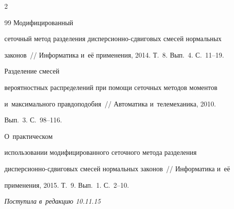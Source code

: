 \begin{multicols}{2}
{{\begin{thebibliography}{99}
  Модифицированный


сеточный метод разделения дис\-пер\-си\-он\-но-сдви\-го\-вых смесей нормальных


законов~// Информатика и~её применения, 2014. Т.~8. Вып.~4. С.~11--19.





  Разделение смесей


вероятностных распределений при помощи сеточных методов моментов 


и~максимального правдоподобия~// Автоматика и~телемеханика, 2010.


Вып.~3. С.~98--116.





  О~практическом


использовании модифицированного сеточного метода разделения


дис\-пер\-си\-он\-но-сдви\-го\-вых смесей нормальных законов~// Информатика и~её


применения, 2015. Т.~9. Вып.~1. С.~2--10.


 \end{thebibliography}





 }


 }





\end{multicols}





\vspace*{-3pt}





\hfill{\small\textit{Поступила в~редакцию 10.11.15}}





\vspace*{8pt}















